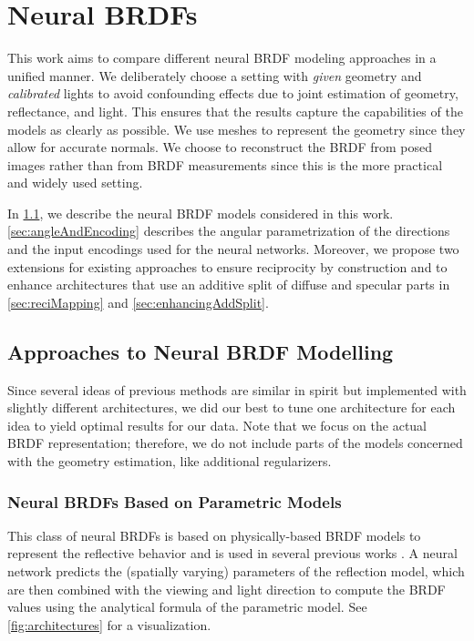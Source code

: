 \section{Neural BRDFs}

This work aims to compare different neural BRDF modeling approaches in a unified manner. We deliberately choose a setting with \emph{given} geometry and \emph{calibrated} lights to avoid confounding effects due to joint estimation of geometry, reflectance, and light. This ensures that the results capture the capabilities of the models as clearly as possible. We use meshes to represent the geometry since they allow for accurate normals. We choose to reconstruct the BRDF from posed images rather than from BRDF measurements since this is the more practical 
and widely used setting.

In \cref{sec:approaches2NeuralBRDF}, we describe the neural BRDF models considered in this work. \cref{sec:angleAndEncoding} describes the angular parametrization of the directions and the input encodings used for the neural networks. Moreover, we propose two extensions for existing approaches to ensure reciprocity by construction and to enhance architectures that use an additive split of diffuse and specular parts in \cref{sec:reciMapping} and \ref{sec:enhancingAddSplit}.


\subsection{Approaches to Neural BRDF Modelling}
\label{sec:approaches2NeuralBRDF}
Since several ideas of previous methods are similar in spirit but implemented with slightly different architectures, we did our best to tune one architecture for each idea to yield optimal results for our data. Note that we focus on the actual BRDF representation; therefore, we do not include parts of the models concerned with the geometry estimation, like \eg additional regularizers.


\subsubsection{Neural BRDFs Based on Parametric Models}
This class of neural BRDFs is based on physically-based BRDF models to represent the reflective behavior and is used in several previous works \cite{bi2020neuralReflectanceFields,srinivasan2021nerv,Boss2021NERD,Zhang22IRON,Deschaintre2018SingleImageSVBRDFCaptureDeepNN,Henzler2021GenerativeModellingBRDFFlashIms,Guo2020MaterialGAN,Zhang21PhySG,Zhang2022ModellingIndirIlluminationInvRendering,brahimi24SparseViewsNearLight,Brahimi24SuperVol}. A neural network predicts the (spatially varying) parameters of the reflection model, which are then combined with the viewing and light direction to compute the BRDF values using the analytical formula of the parametric model. See \cref{fig:architectures} for a visualization.

